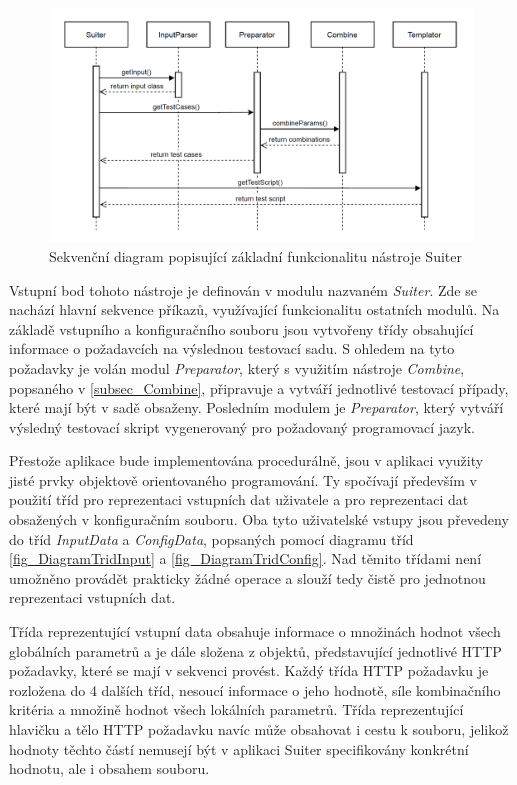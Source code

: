 \begin{figure}[hbt]
	\centering
	\includegraphics[width=1\textwidth]{obrazky-figures/SequenceDiagram2.png}
	\caption{Sekvenční diagram popisující základní funkcionalitu nástroje Suiter}
	\label{fig_SequenceDiagram}
\end{figure}

Vstupní bod tohoto nástroje je definován v modulu nazvaném \textit{Suiter}. Zde se nachází hlavní sekvence příkazů, využívající funkcionalitu ostatních modulů. Na základě vstupního a konfiguračního souboru jsou vytvořeny třídy obsahující informace o požadavcích na výslednou testovací sadu. S ohledem na tyto požadavky je volán modul \textit{Preparator}, který s využitím nástroje \textit{Combine}, popsaného v \ref{subsec_Combine}, připravuje a vytváří jednotlivé testovací případy, které mají být v sadě obsaženy. Posledním modulem je \textit{Preparator}, který vytváří výsledný testovací skript vygenerovaný pro požadovaný programovací jazyk.


Přestože aplikace bude implementována procedurálně, jsou v aplikaci využity jisté prvky objektově orientovaného programování. Ty spočívají především v použití tříd pro reprezentaci vstupních dat uživatele a pro reprezentaci dat obsažených v konfiguračním souboru. Oba tyto uživatelské vstupy jsou převedeny do tříd \textit{InputData} a \textit{ConfigData}, popsaných pomocí diagramu tříd \ref{fig_DiagramTridInput} a \ref{fig_DiagramTridConfig}. Nad těmito třídami není umožněno provádět prakticky žádné operace a slouží tedy čistě pro jednotnou reprezentaci vstupních dat.

Třída reprezentující vstupní data obsahuje informace o množinách hodnot všech globálních parametrů a je dále složena z objektů, představující jednotlivé HTTP požadavky, které se mají v sekvenci provést. Každý třída HTTP požadavku je rozložena do 4 dalších tříd, nesoucí informace o jeho hodnotě, síle kombinačního kritéria a množině hodnot všech lokálních parametrů. Třída reprezentující hlavičku a tělo HTTP požadavku navíc může obsahovat i cestu k souboru, jelikož hodnoty těchto částí nemusejí být v aplikaci Suiter specifikovány konkrétní hodnotu, ale i obsahem souboru.


